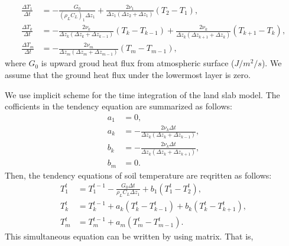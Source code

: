 \begin{align}
  \frac{\Delta T_{1}}{\Delta t} &= - \frac{G_{0}}{(\rho_{L}C_{L})_{1}\Delta z_{1}} + \frac{2\nu_{1}}{\Delta z_{1}(\Delta z_{2}+\Delta z_{1})} (T_{2}-T_{1}), \\
  \frac{\Delta T_{k}}{\Delta t} &= - \frac{2\nu_{k}}{\Delta z_{k}(\Delta z_{k}+\Delta z_{k-1})} (T_{k}-T_{k-1}) + \frac{2\nu_{k}}{\Delta z_{k}(\Delta z_{k+1}+\Delta z_{k})} (T_{k+1}-T_{k}), \\
  \frac{\Delta T_{m}}{\Delta t} &= - \frac{2\nu_{m}}{\Delta z_{m}(\Delta z_{m}+\Delta z_{m-1})} (T_{m}-T_{m-1}),
\end{align}
where $G_{0}$ is upward groud heat flux from atmospheric surface ($J/m^2/s$).
We assume that the ground heat flux under the lowermost layer is zero.

We use implicit scheme for the time integration of the land slab model.
The cofficients in the tendency equation are summarized as follows:
\begin{align}
  a_{1} &= 0, \\
  a_{k} &= - \frac{2\nu_{k}\Delta t}{\Delta z_{k}(\Delta z_{k}+\Delta z_{k-1})}, \\
  b_{k} &= - \frac{2\nu_{k}\Delta t}{\Delta z_{k}(\Delta z_{k}+\Delta z_{k+1})}, \\
  b_{m} &= 0.
\end{align}
Then, the tendency equations of soil temperature are reqritten as follows:
\begin{align}
  T_{1}^{t} &= T_{1}^{t-1} - \frac{G_{0}\Delta t}{\rho_{L}C_{L}\Delta z_{1}} + b_{1} (T_{1}^{t}-T_{2}^{t}), \\
  T_{k}^{t} &= T_{k}^{t-1} + a_{k} (T_{k}^{t}-T_{k-1}^{t}) + b_{k} (T_{k}^{t}-T_{k+1}^{t}), \\
  T_{m}^{t} &= T_{m}^{t-1} + a_{m} (T_{m}^{t}-T_{m-1}^{t}).
\end{align}
This simultaneous equation can be written by using matrix. That is,
